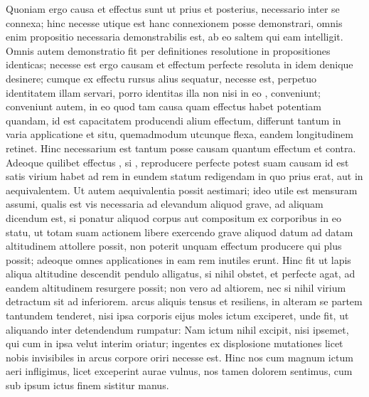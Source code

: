Quoniam ergo causa et effectus  sunt ut prius et posterius, necessario inter se connexa; hinc necesse utique est hanc connexionem posse demonstrari, omnis enim propositio necessaria demonstrabilis est, ab eo saltem qui eam intelligit. Omnis autem demonstratio\protect{} fit per definitiones resolutione in propositiones identicas; necesse est ergo causam et effectum perfecte resoluta in idem denique desinere; cumque ex effectu rursus alius sequatur, necesse est, perpetuo identitatem illam servari, porro identitas illa non nisi in eo ,  conveniunt; conveniunt autem, in eo quod tam causa quam effectus habet potentiam quandam, id est capacitatem producendi alium effectum, differunt tantum in varia applicatione et situ, quemadmodum  utcunque flexa, eandem longitudinem retinet. Hinc necessarium est tantum posse causam quantum effectum et contra. Adeoque quilibet effectus , si , reproducere perfecte potest suam causam id est satis virium habet ad rem in eundem statum redigendam in quo prius erat, aut in aequivalentem. Ut autem aequivalentia possit aestimari; ideo utile est mensuram assumi, qualis est vis necessaria ad elevandum aliquod grave, ad aliquam  dicendum est, si ponatur aliquod corpus aut compositum ex corporibus in eo statu, ut totam suam actionem libere exercendo grave aliquod datum ad datam altitudinem attollere possit, non poterit unquam  effectum producere qui plus possit; adeoque omnes applicationes in eam rem inutiles erunt. 
\pend 
\pstart 
Hinc fit ut lapis  aliqua altitudine descendit pendulo alligatus, si nihil obstet, et perfecte agat, ad eandem altitudinem resurgere possit; non vero ad altiorem, nec si nihil virium detractum sit ad inferiorem.  arcus aliquis tensus et resiliens, in alteram se partem tantundem tenderet, nisi ipsa corporis eijus moles ictum exciperet, unde fit, ut aliquando inter detendendum rumpatur: Nam ictum nihil excipit, nisi ipsemet, qui cum in ipsa  velut interim oriatur; ingentes ex displosione mutationes licet nobis invisibiles in arcus\protect{} corpore oriri necesse est. Hinc nos cum magnum ictum aeri infligimus, licet exceperint aurae vulnus, nos tamen dolorem sentimus, cum sub ipsum ictus finem sistitur manus. \pend 
